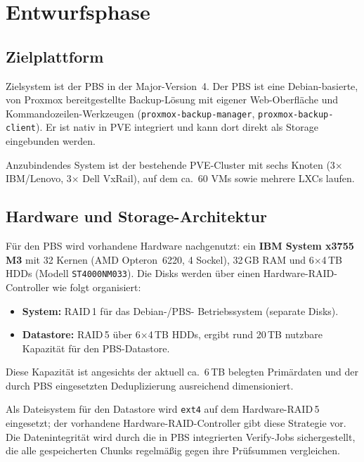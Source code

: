 \section{Entwurfsphase}
\label{sec:Entwurfsphase}

\subsection{Zielplattform}
\label{sec:Zielplattform}
Zielsystem ist der \acl{PBS} in der Major-Version~4.
Der \ac{PBS} ist eine Debian-basierte, von Proxmox bereitgestellte
Backup-Lösung mit eigener Web-Oberfläche und Kommandozeilen-Werkzeugen
(\texttt{proxmox-backup-manager}, \texttt{proxmox-backup-client}).
Er ist nativ in \ac{PVE} integriert und kann dort direkt als Storage
eingebunden werden.

Anzubindendes System ist der bestehende \ac{PVE}-Cluster mit sechs
Knoten (3$\times$ IBM/Lenovo, 3$\times$ Dell VxRail), auf dem ca.~60
\acp{VM} sowie mehrere \acp{LXC} laufen.


\subsection{Hardware und Storage-Architektur}
\label{sec:HardwareStorage}
Für den \ac{PBS} wird vorhandene Hardware nachgenutzt: ein
\textbf{IBM System x3755 M3} mit 32 Kernen (AMD Opteron~6220,
4 Sockel), 32\,GB \ac{RAM} und 6$\times$4\,TB HDDs
(Modell \texttt{ST4000NM033}).
Die Disks werden über einen Hardware-\ac{RAID}-Controller wie folgt
organisiert:
\begin{itemize}
    \item \textbf{System:} \ac{RAID}\,1 für das Debian-/\ac{PBS}-
          Betriebssystem (separate Disks).
    \item \textbf{Datastore:} \ac{RAID}\,5 über 6$\times$4\,TB HDDs,
          ergibt rund 20\,TB nutzbare Kapazität für den
          \ac{PBS}-Datastore.
\end{itemize}
Diese Kapazität ist angesichts der aktuell ca.\ 6\,TB belegten
Primärdaten und der durch \ac{PBS} eingesetzten Deduplizierung
ausreichend dimensioniert.

Als Dateisystem für den Datastore wird \texttt{ext4} auf dem
Hardware-\ac{RAID}\,5 eingesetzt; der vorhandene
Hardware-\ac{RAID}-Controller gibt diese Strategie vor. Die
Datenintegrität wird durch die in \ac{PBS} integrierten Verify-Jobs
sichergestellt, die alle gespeicherten Chunks regelmäßig gegen ihre
Prüfsummen vergleichen.


